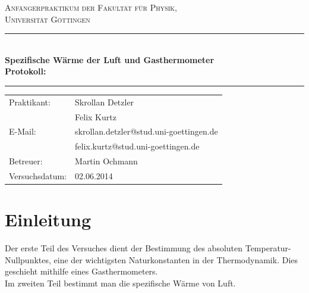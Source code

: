 \documentclass[12pt,a4paper,titlepage,headinclude,bibtotoc]{scrartcl}
\begin{document}
\begin{titlepage}
\centering
\textsc{\Large Anfängerpraktikum der Fakultät für
  Physik,\\[1.5ex] Universität Göttingen}

\vspace*{4.2cm}

\rule{\textwidth}{1pt}\\[0.5cm]
{\huge \bfseries
  Spezifische Wärme der Luft und Gasthermometer\\[1.5ex]
  Protokoll:}\\[0.5cm]
\rule{\textwidth}{1pt}

\vspace*{2.0cm}

\begin{Large}
\begin{tabular}{ll}
Praktikant:
	&  Skrollan Detzler\\
 	&  Felix Kurtz\\

  E-Mail: 
	&  skrollan.detzler@stud.uni-goettingen.de\\
	&  felix.kurtz@stud.uni-goettingen.de\\
	

 Betreuer: & Martin Ochmann\\
 Versuchsdatum: & 02.06.2014\\
\end{tabular}
\end{Large}

\vspace*{0.8cm}

\begin{Large}
\end{Large}

\end{titlepage}

\tableofcontents

\newpage

\section{Einleitung}
\label{sec:einleitung}
Der erste Teil des Versuches dient der Bestimmung des absoluten Temperatur-Nullpunktes, eine der wichtigsten Naturkonstanten in der Thermodynamik.
Dies geschieht mithilfe eines Gasthermometers.\\
Im zweiten Teil bestimmt man die spezifische Wärme von Luft.
\end{document}
